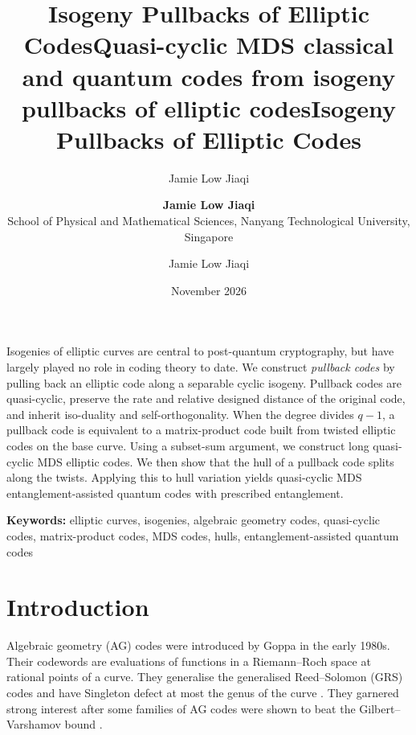 \documentclass[twocolumn, 11pt]{scrartcl}
\title{Isogeny Pullbacks of Elliptic Codes}
\author{Jamie Low Jiaqi}
\begin{document}
\title{\textbf{Quasi-cyclic MDS classical and quantum codes from isogeny pullbacks of elliptic codes}}
\author{\textbf{Jamie Low Jiaqi}\\School of Physical and Mathematical Sciences, Nanyang Technological University, Singapore}
\date{November 2026}
\maketitle

\title{Isogeny Pullbacks of Elliptic Codes}
\author{Jamie Low Jiaqi}
\date{}


Isogenies of elliptic curves are central to post-quantum cryptography, but have largely played no role in coding theory to date. We construct \textit{pullback codes} by pulling back an elliptic code along a separable cyclic isogeny. Pullback codes are quasi-cyclic, preserve the rate and relative designed distance of the original code, and inherit iso-duality and self-orthogonality. When the degree divides $q-1$, a pullback code is equivalent to a matrix-product code built from twisted elliptic codes on the base curve. Using a subset-sum argument, we construct long quasi-cyclic MDS elliptic codes. We then show that the hull of a pullback code splits along the twists. Applying this to hull variation yields quasi-cyclic MDS entanglement-assisted quantum codes with prescribed entanglement.

\textbf{Keywords:} elliptic curves, isogenies, algebraic geometry codes, quasi-cyclic codes, matrix-product codes, MDS codes, hulls, entanglement-assisted quantum codes

\section{Introduction} \label{section:introduction}

Algebraic geometry (AG) codes were introduced by Goppa \cite{goppa1983algebraico} in the early 1980s. Their codewords are evaluations of functions in a Riemann--Roch space at rational points of a curve. They generalise the generalised Reed--Solomon (GRS) codes \cite{macwilliams1977theory} and have Singleton defect at most the genus of the curve \cite{stichtenoth2009algebraic}. They garnered strong interest after some families of AG codes were shown to beat the Gilbert--Varshamov bound \cite{tsfasman1982modular}.
\end{document}
